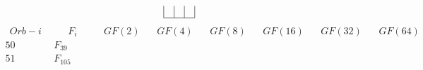 \documentclass{article}
\begin{document}
{$$\begin{array}{|r|*{7}{r|}}
 & 
 & 
\\
\hline
\end{array}
$$
$$
\begin{array}{|r|*{7}{r|}}
\hline
\ \ Orb-i \ \ &\ \ \quad F_i \quad \ \   &\ \ GF(2)\ \ &\ \ GF(4)\ \ &\ \ GF(8)\ \ &\ \ GF(16)\ \ &\ \ GF(32)\ \ &\ \ GF(64)\ \ \\
\hline
50 
 & F_{39} &
 & 
 & 
 & 
 & 
 & 
\\
\hline
51 
 & F_{105} &
 & 
 & 
 & 
 & 
 & 

\end{array}$$}
\end{document}
